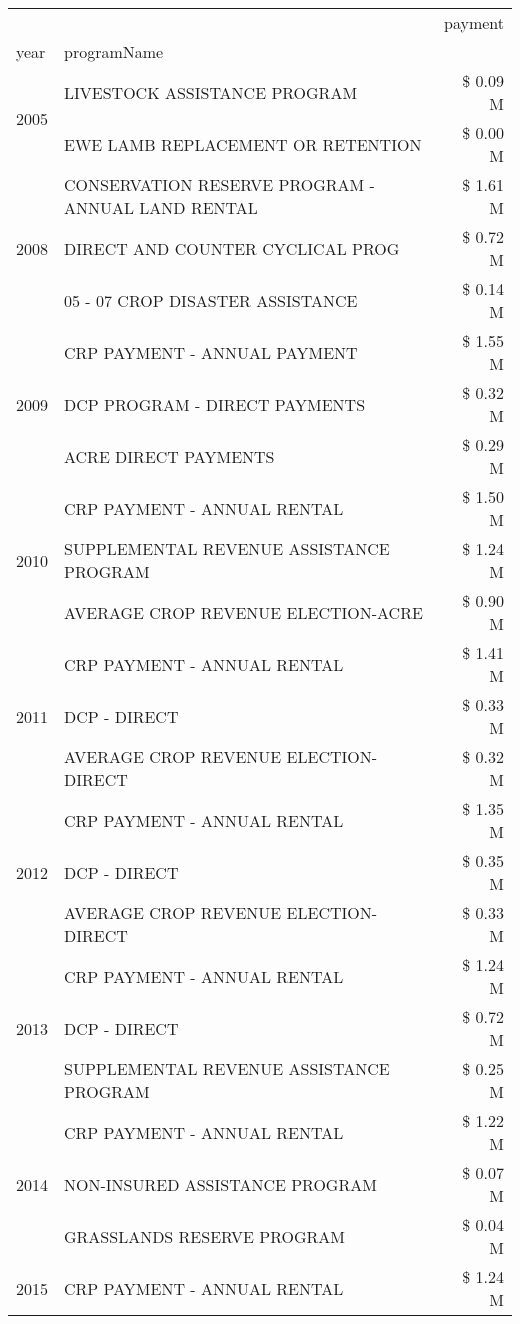 \begin{tabular}{llr}
\toprule
 &  & payment \\
year & programName &  \\
\midrule
\multirow[t]{2}{*}{2005} & LIVESTOCK ASSISTANCE PROGRAM & \$ 0.09 M \\
 & EWE LAMB REPLACEMENT OR RETENTION & \$ 0.00 M \\
\cline{1-3}
\multirow[t]{3}{*}{2008} & CONSERVATION RESERVE PROGRAM - ANNUAL LAND RENTAL & \$ 1.61 M \\
 & DIRECT AND COUNTER CYCLICAL PROG & \$ 0.72 M \\
 & 05 - 07 CROP DISASTER ASSISTANCE & \$ 0.14 M \\
\cline{1-3}
\multirow[t]{3}{*}{2009} & CRP PAYMENT - ANNUAL PAYMENT & \$ 1.55 M \\
 & DCP PROGRAM - DIRECT PAYMENTS & \$ 0.32 M \\
 & ACRE DIRECT PAYMENTS & \$ 0.29 M \\
\cline{1-3}
\multirow[t]{3}{*}{2010} & CRP PAYMENT - ANNUAL RENTAL & \$ 1.50 M \\
 & SUPPLEMENTAL REVENUE ASSISTANCE PROGRAM & \$ 1.24 M \\
 & AVERAGE CROP REVENUE ELECTION-ACRE & \$ 0.90 M \\
\cline{1-3}
\multirow[t]{3}{*}{2011} & CRP PAYMENT - ANNUAL RENTAL & \$ 1.41 M \\
 & DCP - DIRECT & \$ 0.33 M \\
 & AVERAGE CROP REVENUE ELECTION-DIRECT & \$ 0.32 M \\
\cline{1-3}
\multirow[t]{3}{*}{2012} & CRP PAYMENT - ANNUAL RENTAL & \$ 1.35 M \\
 & DCP - DIRECT & \$ 0.35 M \\
 & AVERAGE CROP REVENUE ELECTION-DIRECT & \$ 0.33 M \\
\cline{1-3}
\multirow[t]{3}{*}{2013} & CRP PAYMENT - ANNUAL RENTAL & \$ 1.24 M \\
 & DCP - DIRECT & \$ 0.72 M \\
 & SUPPLEMENTAL REVENUE ASSISTANCE PROGRAM & \$ 0.25 M \\
\cline{1-3}
\multirow[t]{3}{*}{2014} & CRP PAYMENT - ANNUAL RENTAL & \$ 1.22 M \\
 & NON-INSURED ASSISTANCE PROGRAM & \$ 0.07 M \\
 & GRASSLANDS RESERVE PROGRAM & \$ 0.04 M \\
\cline{1-3}
\multirow[t]{3}{*}{2015} & CRP PAYMENT - ANNUAL RENTAL & \$ 1.24 M \\

\end{tabular}
